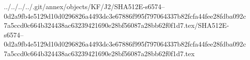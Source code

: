 ../../../../.git/annex/objects/KF/J2/SHA512E-s6574--0d2a9fb4e5129d10d0296826a4493dc3e67886f995f797064337b82fcfa44fee28fdba092c7a5ccd0c664b324438ac63239421690e28bf56087a28bb62f0f1d7.tex/SHA512E-s6574--0d2a9fb4e5129d10d0296826a4493dc3e67886f995f797064337b82fcfa44fee28fdba092c7a5ccd0c664b324438ac63239421690e28bf56087a28bb62f0f1d7.tex